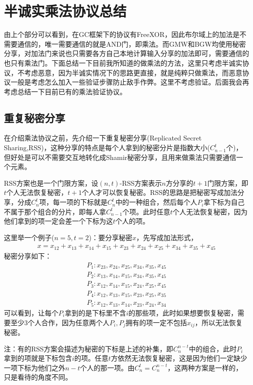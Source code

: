 \documentclass[UTF8]{ctexart}
\theoremstyle{nonumberplain}
\theoremstyle{plain}
\begin{document}
\section{半诚实乘法协议总结}
由上个部分可以看到，在GC框架下的协议有FreeXOR，因此布尔域上的加法是不需要通信的，唯一需要通信的就是AND门，即乘法。而GMW和BGW均使用秘密分享，对加法门来说也只需要各方自己本地计算输入分享的加法即可，需要通信的也只有乘法门。{}下面总结一下目前我所知道的做乘法的方法，这里只考虑半诚实协议，不考虑恶意，因为半诚实情况下的思路更直接，就是纯粹只做乘法，而恶意协议一般是考虑怎么加入一些验证步骤防止敌手作弊。这里不考虑验证。后面我会再考虑总结一下目前已有的乘法验证协议。
\subsection{重复秘密分享}
在介绍乘法协议之前，先介绍一下重复秘密分享(Replicated Secret Sharing,RSS)，这种分享的特点是每个人拿到的秘密分片是指数大小($C_{n-1}^t$个)，但好处是可以不需要交互地转化成Shamir秘密分享，且用来做乘法只需要通信一个元素。

RSS方案也是一个门限方案，设$(n,t)$-RSS方案表示$n$方分享的$t+1$门限方案，即$t$个人无法恢复秘密，$t+1$个人才可以恢复秘密。RSS的思路是把秘密写成加法分享，分成$C_n^t$项，每一项的下标就是$C_n^t$中的一种组合，然后每个人$P_i$拿下标为自己不属于那个组合的分片，即每人拿$C_{n-1}^t$个项。此时任意$t$个人无法恢复秘密，因为他们拿到的项一定会差一个下标为这$t$个人的项。

这里举一个例子($n=5,t=2$)：要分享秘密$x$，先写成加法形式，
\begin{align*}
x=x_{12}+x_{13}+x_{14}+x_{15}+x_{23}+x_{24}+x_{25}+x_{34}+x_{35}+x_{45}
\end{align*}
秘密分享如下：
\begin{align*}
P_1:x_{23},x_{24},x_{25},x_{34},x_{35},x_{45}\\
P_2:x_{13},x_{14},x_{15},x_{34},x_{35},x_{45}\\
P_3:x_{12},x_{14},x_{15},x_{24},x_{25},x_{45}\\
P_4:x_{12},x_{13},x_{15},x_{23},x_{25},x_{35}\\
P_5:x_{12},x_{13},x_{14},x_{23},x_{24},x_{34}
\end{align*}
可以看到，让每个$P_i$拿到的是下标里不含$i$的那些项，此时如果想要恢复秘密，需要至少$3$个人合作，因为任意两个人$P_i,P_j$拥有的项一定不包括$x_{ij}$，所以无法恢复秘密。

注：有的RSS方案会描述为秘密的下标是上述的补集，即$C_{n}^{n-t}$中的组合，此时$P_i$拿到的项就是下标包含$i$的项。任意$t$方依然无法恢复秘密，这是因为他们一定缺少一项下标为他们之外$n-t$个人的那一项。由$C_n^t=C_n^{n-t}$，这两种方案是一样的，只是看待的角度不同。
\end{document}
